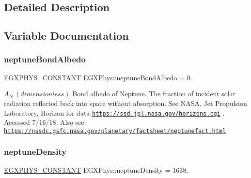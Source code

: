 \subsection{Detailed Description}


\subsection{Variable Documentation}
\mbox{\label{group___e_g_x_phys-_constants-_astrophysics-_solar_system-_neptune-_bulk_ga137db2e1098663225fe5541e16abdac5}} 
\subsubsection{\texorpdfstring{neptune\+Bond\+Albedo}{neptuneBondAlbedo}}
{\footnotesize\ttfamily \mbox{\hyperlink{group___e_g_x_phys-_constants-_macros_ga76980d288494ce1714c9ac68a95ba702}{E\+G\+X\+P\+H\+Y\+S\+\_\+\+C\+O\+N\+S\+T\+A\+NT}} E\+G\+X\+Phys\+::neptune\+Bond\+Albedo = 0.}

$ A_{N} \ (dimensionless)$ Bond albedo of Neptune. The fraction of incident solar radiation reflected back into space without absorption. See N\+A\+SA, Jet Propulsion Laboratory, Horizon for data \href{https://ssd.jpl.nasa.gov/horizons.cgi}{\tt https\+://ssd.\+jpl.\+nasa.\+gov/horizons.\+cgi} . Accessed 7/16/18. Also see \href{https://nssdc.gsfc.nasa.gov/planetary/factsheet/neptunefact.html}{\tt https\+://nssdc.\+gsfc.\+nasa.\+gov/planetary/factsheet/neptunefact.\+html} \mbox{\label{group___e_g_x_phys-_constants-_astrophysics-_solar_system-_neptune-_bulk_ga17739a846a91af160e948129d93cefe9}} 
\subsubsection{\texorpdfstring{neptune\+Density}{neptuneDensity}}
{\footnotesize\ttfamily \mbox{\hyperlink{group___e_g_x_phys-_constants-_macros_ga76980d288494ce1714c9ac68a95ba702}{E\+G\+X\+P\+H\+Y\+S\+\_\+\+C\+O\+N\+S\+T\+A\+NT}} E\+G\+X\+Phys\+::neptune\+Density = 1638.}

